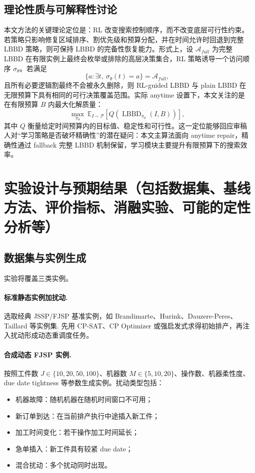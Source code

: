 \documentclass[UTF8,12pt,a4paper]{ctexart}
\newcommand{\E}{\mathbb{E}}
\begin{document}
\subsection{理论性质与可解释性讨论}

本文方法的关键理论定位是：RL 改变搜索控制顺序，而不改变底层可行性约束。若策略只影响修复区域排序、割优先级和预算分配，并在时间允许时回退到完整 LBBD 策略，则可保持 LBBD 的完备性恢复能力。形式上，设 $\mathcal{A}_{full}$ 为完整 LBBD 在有限实例上最终会枚举或排除的高层决策集合，RL 策略诱导一个访问顺序 $\sigma_\theta$。若满足
\begin{equation}
    \{a:\exists t,\ \sigma_\theta(t)=a\}=\mathcal{A}_{full},
\end{equation}
且所有必要逻辑割最终不会被永久删除，则 RL-guided LBBD 与 plain LBBD 在无限预算下具有相同的可行决策覆盖范围。实际 anytime 设置下，本文关注的是在有限预算 $B$ 内最大化解质量：
\begin{equation}
    \max_{\pi_\theta}\ \E_{I\sim\mathcal{P}}\left[Q(\operatorname{LBBD}_{\pi_\theta}(I,B))\right],
\end{equation}
其中 $Q$ 衡量给定时间预算内的目标值、稳定性和可行性。这一定位能够回应审稿人对“学习策略是否破坏精确性”的潜在疑问：本文主算法面向 anytime repair，精确性通过 fallback 完整 LBBD 机制保留，学习模块主要提升有限预算下的搜索效率。

\section{实验设计与预期结果（包括数据集、基线方法、评价指标、消融实验、可能的定性分析等）}

\subsection{数据集与实例生成}

实验将覆盖三类实例。

\paragraph{标准静态实例加扰动.} 选取经典 JSSP/FJSP 基准实例，如 Brandimarte、Hurink、Dauzere-Peres、Taillard 等实例集\cite{ref_benchmark1,ref_benchmark2}. 先用 CP-SAT、CP Optimizer 或强启发式求得初始排产，再注入扰动形成动态重调度任务。

\paragraph{合成动态 FJSP 实例.} 按照工件数 $J\in\{10,20,50,100\}$、机器数 $M\in\{5,10,20\}$、操作数、机器柔性度、due date tightness 等参数生成实例。扰动类型包括：
\begin{itemize}
    \item 机器故障：随机机器在随机时间窗口不可用；
    \item 新订单到达：在当前排产执行中途插入新工件；
    \item 加工时间变化：若干操作加工时间延长；
    \item 急单插入：新工件具有较紧 due date；
    \item 混合扰动：多个扰动同时出现。
\end{itemize}
\end{document}
